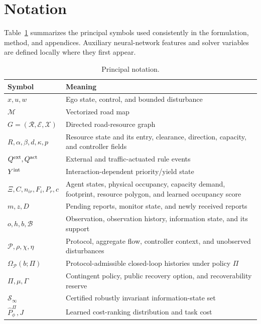 \documentclass[letterpaper]{article} %
\begin{document}
\appendix

\section{Notation}
\label{app:notation}
Table~\ref{tab:notation} summarizes the principal symbols used consistently
in the formulation, method, and appendices. Auxiliary neural-network features
and solver variables are defined locally where they first appear.
\begin{table}[t]
\centering
\small
\begin{tabular}{@{}p{}p{}@{}}
\toprule
Symbol & Meaning \\
\midrule
$x,u,w$ & Ego state, control, and bounded disturbance \\
$\mathcal M$ & Vectorized road map \\
$G=(\mathcal R,\mathcal E,\mathcal X)$ & Directed road-resource graph \\
$R,\alpha,\beta,d,\kappa,p$ & Resource state and its entry, clearance, direction, capacity, and controller fields \\
$Q^{\rm ext},Q^{\rm act}$ & External and traffic-actuated rule events \\
$Y^{\rm int}$ & Interaction-dependent priority/yield state \\
$\Xi,C,n_{ir},F_i,P_r,\widehat c$ & Agent states, physical occupancy, capacity demand, footprint, resource polygon, and learned occupancy score \\
$m,z,D$ & Pending reports, monitor state, and newly received reports \\
$o,h,b,\mathcal B$ & Observation, observation history, information state, and its support \\
$\mathcal P,\rho,\chi,\eta$ & Protocol, aggregate flow, controller context, and unobserved disturbances \\
$\Omega_{\mathcal P}(b;\Pi)$ & Protocol-admissible closed-loop histories under policy $\Pi$ \\
$\Pi,\mu,\Gamma$ & Contingent policy, public recovery option, and recoverability reserve \\
$\mathcal S_\infty$ & Certified robustly invariant information-state set \\
$\widehat P_\phi^{\Pi},J$ & Learned cost-ranking distribution and task cost \\
\bottomrule
\end{tabular}
\caption{Principal notation.}
\label{tab:notation}
\end{table}
\end{document}
